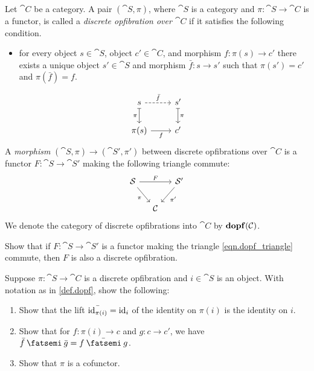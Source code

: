 \documentclass[Book-Poly]{subfiles}
\begin{document}
\begin{definition}\label{def.dopf}
Let $\cat{C}$ be a category. A pair $(\cat{S},\pi)$, where $\cat{S}$ is a category and $\pi\colon\cat{S}\to\cat{C}$ is a functor, is called a \emph{discrete opfibration over $\cat{C}$} if it satisfies the following condition.
\begin{itemize}
	\item for every object $s\in\cat{S}$, object $c'\in\cat{C}$, and morphism $f\colon \pi(s)\to c'$ there exists a unique object $s'\in\cat{S}$ and morphism $\bar{f}\colon s\to s'$ such that $\pi(s')=c'$ and $\pi(\bar{f})=f$.
\end{itemize}
\[
\begin{tikzcd}
  s\ar[r, dashed, "\bar{f}"]\ar[d, |->, "\pi"']&
  s'\ar[d, |->, "\pi"]\\
  \pi(s)\ar[r, "f"']&
  c'
\end{tikzcd}
\]
A \emph{morphism} $(\cat{S},\pi)\to(\cat{S}',\pi')$ between discrete opfibrations over $\cat{C}$ is a functor $F\colon\cat{S}\to\cat{S}'$ making the following triangle commute:
\begin{equation}\label{eqn.dopf_triangle}
\begin{tikzcd}[column sep=small]
	\cat{S}\ar[dr, "\pi"']\ar[rr, "F"]&&
	\cat{S}'\ar[dl, "\pi'"]\\&
	\cat{C}
\end{tikzcd}
\end{equation}
We denote the category of discrete opfibrations into $\cat{C}$ by $\mathbf{dopf}(\mathcal{C})$.
\end{definition}

\begin{exercise}
Show that if $F\colon \cat{S}\to\cat{S}'$ is a functor making the triangle \eqref{eqn.dopf_triangle} commute, then $F$ is also a discrete opfibration. 
\end{exercise}

\begin{exercise}\label{exc.dopf_cof}
Suppose $\pi\colon\cat{S}\to\cat{C}$ is a discrete opfibration and $i\in\cat{S}
$ is an object. With notation as in \cref{def.dopf}, show the following:
\begin{enumerate}
	\item Show that the lift $\bar{\mathrm{id}_{\pi(i)}}=\mathrm{id}_i$ of the identity on $\pi(i)$ is the identity on $i$.
	\item Show that for $f\colon\pi(i)\to c$ and $g\colon c\to c'$, we have $\bar{f}\then\bar{g}=\bar{f\then g}$.
	\item Show that $\pi$ is a cofunctor.
\qedhere
\end{enumerate}
\end{exercise}
\end{document}

